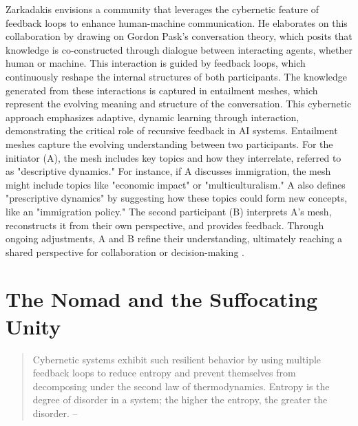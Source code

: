 Zarkadakis envisions a community that leverages the cybernetic feature of feedback loops to enhance human-machine communication. He elaborates on this collaboration by drawing on Gordon Pask's conversation theory, which posits that knowledge is co-constructed through dialogue between interacting agents, whether human or machine. This interaction is guided by feedback loops, which continuously reshape the internal structures of both participants. The knowledge generated from these interactions is captured in entailment meshes, which represent the evolving meaning and structure of the conversation. This cybernetic approach emphasizes adaptive, dynamic learning through interaction, demonstrating the critical role of recursive feedback in AI systems. Entailment meshes capture the evolving understanding between two participants. For the initiator (A), the mesh includes key topics and how they interrelate, referred to as "descriptive dynamics." For instance, if A discusses immigration, the mesh might include topics like "economic impact" or "multiculturalism." A also defines "prescriptive dynamics" by suggesting how these topics could form new concepts, like an "immigration policy." The second participant (B) interprets A’s mesh, reconstructs it from their own perspective, and provides feedback. Through ongoing adjustments, A and B refine their understanding, ultimately reaching a shared perspective for collaboration or decision-making \parencite[25-27]{zarkadakes2020}. 

\section{The Nomad and the Suffocating Unity}

\begin{quote} Cybernetic systems exhibit such resilient behavior by using multiple feedback loops to reduce entropy and prevent themselves from decomposing under the second law of thermodynamics. Entropy is the degree of disorder in a system; the higher the entropy, the greater the disorder. -- \cite[27]{zarkadakes2020} \end{quote}

